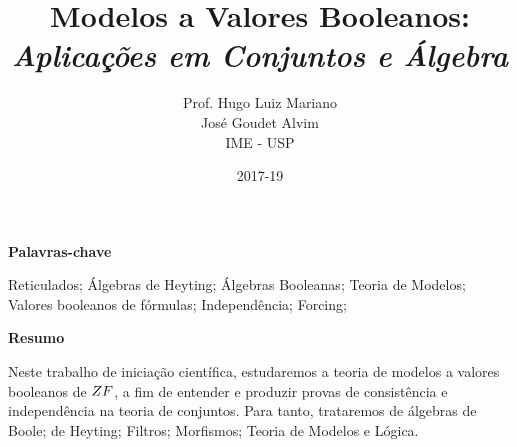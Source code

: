 \documentclass[12pt]{report}
\title{{\bf Modelos a Valores Booleanos:}\\ \em Aplicações em Conjuntos e Álgebra}
\author{
    {\large  Prof.  Hugo Luiz Mariano}\\
                    José Goudet Alvim\\
    IME - USP
}
\date{2017-19}
\begin{document}
    \maketitle
    \justify
    \begin{center}{\bf Palavras-chave}\end{center}
        Reticulados; Álgebras de Heyting; Álgebras Booleanas;
        Teoria de Modelos; Valores booleanos de fórmulas;
        Independência; Forcing;
    \begin{center}{\bf Resumo}\end{center}
        Neste trabalho de iniciação científica, estudaremos
        a teoria de modelos a valores booleanos de $\sc ZF$,
        a fim de entender e produzir provas de consistência
        e independência na teoria de conjuntos. Para tanto,
        trataremos de álgebras de Boole; de Heyting; Filtros;
        Morfismos; Teoria de Modelos e Lógica.
    \cls

    \tableofcontents
    \cls

    
\end{document}
